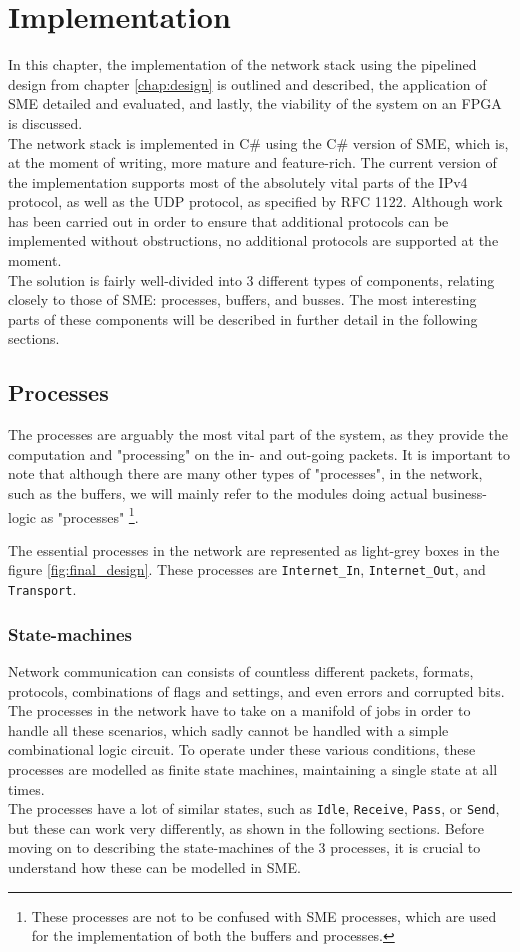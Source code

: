 \chapter{Implementation}
\label{chap:implementation}
In this chapter, the implementation of the network stack using the
pipelined design from chapter \ref{chap:design} is outlined and described,
the application of SME detailed and evaluated, and lastly, the viability
of the system on an FPGA is discussed.\\
The network stack is implemented in C\# using the C\# version of SME, which is,
at the moment of writing, more mature and feature-rich. The current version of
the implementation supports most of the absolutely vital parts of the IPv4
protocol, as well as the UDP protocol, as specified by RFC 1122\cite{RFC1122}.
Although work has been carried out in order to ensure that additional protocols
can be implemented without obstructions, no additional protocols are supported
at the moment.\\
The solution is fairly well-divided into 3 different types of components,
relating closely to those of SME: processes, buffers, and busses. The most
interesting parts of these components will be described in further detail in the
following sections.


\section{Processes}
The processes are arguably the most vital part of the system, as they provide
the computation and "processing" on the in- and out-going packets.
It is important to note that although there are many other types of "processes",
in the network, such as the buffers, we will mainly refer to the modules doing
actual business-logic as "processes" \footnote{These processes are not to be
confused with SME processes, which are used for the implementation of both the
buffers and processes.}.

The essential processes in the network are represented as light-grey boxes in
the figure \ref{fig:final_design}. These processes are \texttt{Internet\_In},
\texttt{Internet\_Out}, and \texttt{Transport}.


\subsection{State-machines}
Network communication can consists of countless different packets, formats,
protocols, combinations of flags and settings, and even errors and corrupted
bits. The processes in the network have to take on a manifold of jobs in order
to handle all these scenarios, which sadly cannot be handled with a simple
combinational logic circuit. To operate under these various conditions, these
processes are modelled as finite state machines, maintaining a single state at
all times.\\
The processes have a lot of similar states, such as \texttt{Idle}, \texttt{Receive},
\texttt{Pass}, or \texttt{Send}, but these can work very differently, as shown
in the following sections. Before moving on to describing the state-machines of
the 3 processes, it is crucial to understand how these can be modelled in SME.

